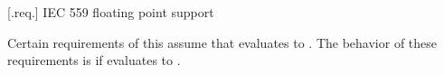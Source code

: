  [\iotwod.req.\iecfivefivenine] {IEC 559 floating point support}

\pnum
Certain requirements of this \documenttypename{} assume that  evaluates to . The behavior of these requirements is  if  evaluates to .

%
